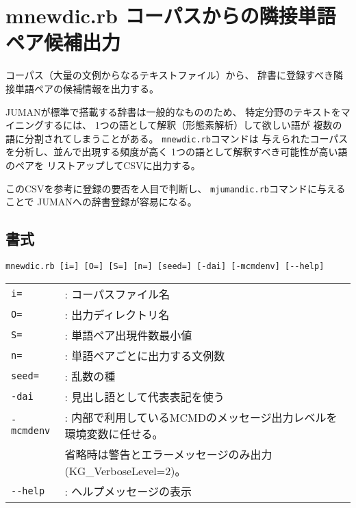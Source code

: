 



\section{mnewdic.rb コーパスからの隣接単語ペア候補出力\label{sect:mnewdic}}

コーパス（大量の文例からなるテキストファイル）から、
辞書に登録すべき隣接単語ペアの候補情報を出力する。

JUMANが標準で搭載する辞書は一般的なもののため、
特定分野のテキストをマイニングするには、
1つの語として解釈（形態素解析）して欲しい語が
複数の語に分割されてしまうことがある。
\verb|mnewdic.rb|コマンドは
与えられたコーパスを分析し、並んで出現する頻度が高く
1つの語として解釈すべき可能性が高い語のペアを
リストアップしてCSVに出力する。

このCSVを参考に登録の要否を人目で判断し、
\verb|mjumandic.rb|コマンドに与えることで
JUMANへの辞書登録が容易になる。


\subsection{書式}
\begin{verbatim}
mnewdic.rb [i=] [O=] [S=] [n=] [seed=] [-dai] [-mcmdenv] [--help]
\end{verbatim}

\begin{table}[htbp]
{\small
\begin{tabular}{ll}
\verb|i=|       & : コーパスファイル名 \\
\verb|O=|       & : 出力ディレクトリ名 \\
\verb|S=|       & : 単語ペア出現件数最小値 \\
\verb|n=|       & : 単語ペアごとに出力する文例数 \\
\verb|seed=|    & : 乱数の種 \\
\verb|-dai|     & : 見出し語として代表表記を使う \\
\verb|-mcmdenv| & : 内部で利用しているMCMDのメッセージ出力レベルを環境変数に任せる。 \\
                &   省略時は警告とエラーメッセージのみ出力(KG\_VerboseLevel=2)。 \\
\verb|--help|   & : ヘルプメッセージの表示 \\
\end{tabular} 
}
\end{table} 


